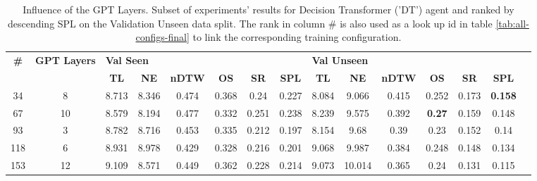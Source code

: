\begin{table}
\centering
\caption{\label{tab:dt_layers}Influence of the GPT Layers. Subset of experiments' results for Decision Transformer ('DT') agent and ranked by descending SPL on the Validation Unseen data split. The rank in column \# is also used as a look up id in table \ref{tab:all-configs-final} to link the corresponding training configuration.}
\begin{tabular}{@{\hskip3pt}c@{\hskip3pt}c@{\hskip3pt}c@{\hskip3pt}c@{\hskip3pt}c@{\hskip3pt}c@{\hskip3pt}c@{\hskip3pt}c@{\hskip3pt}c@{\hskip3pt}c@{\hskip3pt}c@{\hskip3pt}c@{\hskip3pt}c@{\hskip3pt}c@{\hskip3pt}c}
\toprule
\textbf{\#} & \textbf{GPT Layers} & \multicolumn{6}{l}{\textbf{Val Seen}} & \multicolumn{6}{l}{\textbf{Val Unseen}} \\
 \textbf{~} &          \textbf{~} &       \textbf{TL} & \textbf{NE} & \textbf{nDTW} & \textbf{OS} & \textbf{SR} & \textbf{SPL} &         \textbf{TL} & \textbf{NE} & \textbf{nDTW} &    \textbf{OS} & \textbf{SR} &    \textbf{SPL} \\
\midrule
         34 &                   8 &             8.713 &       8.346 &         0.474 &       0.368 &        0.24 &        0.227 &               8.084 &       9.066 &         0.415 &          0.252 &       0.173 &  \textbf{0.158} \\
         67 &                  10 &             8.579 &       8.194 &         0.477 &       0.332 &       0.251 &        0.238 &               8.239 &       9.575 &         0.392 &  \textbf{0.27} &       0.159 &           0.148 \\
         93 &                   3 &             8.782 &       8.716 &         0.453 &       0.335 &       0.212 &        0.197 &               8.154 &        9.68 &          0.39 &           0.23 &       0.152 &            0.14 \\
        118 &                   6 &             8.931 &       8.978 &         0.429 &       0.328 &       0.216 &        0.201 &               9.068 &       9.987 &         0.384 &          0.248 &       0.148 &           0.134 \\
        153 &                  12 &             9.109 &       8.571 &         0.449 &       0.362 &       0.228 &        0.214 &               9.073 &      10.014 &         0.365 &           0.24 &       0.131 &           0.115 \\
\bottomrule
\end{tabular}
\end{table}
